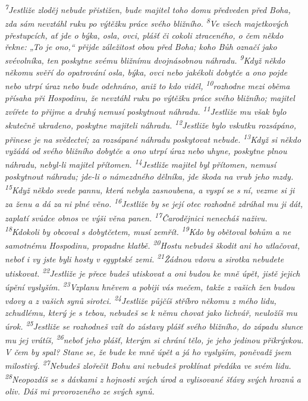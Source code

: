 \documentclass[11pt]{article}
\begin{document}
\textit{
\textsuperscript{7}Jestliže zloděj nebude přistižen, bude majitel toho domu předveden před Boha, zda sám nevztáhl ruku po výtěžku práce svého bližního.
\textsuperscript{8}Ve všech majetkových přestupcích, ať jde o býka, osla, ovci, plášť či cokoli ztraceného, o čem někdo řekne: „To je ono,“ přijde záležitost obou před Boha; koho Bůh označí jako svévolníka, ten poskytne svému bližnímu dvojnásobnou náhradu.
\textsuperscript{9}Když někdo někomu svěří do opatrování osla, býka, ovci nebo jakékoli dobytče a ono pojde nebo utrpí úraz nebo bude odehnáno, aniž to kdo viděl,
\textsuperscript{10}rozhodne mezi oběma přísaha při Hospodinu, že nevztáhl ruku po výtěžku práce svého bližního; majitel zvířete to přijme a druhý nemusí poskytnout náhradu.
\textsuperscript{11}Jestliže mu však bylo skutečně ukradeno, poskytne majiteli náhradu.
\textsuperscript{12}Jestliže bylo vskutku rozsápáno, přinese je na svědectví; za rozsápané náhradu poskytovat nebude.
\textsuperscript{13}Když si někdo vyžádá od svého bližního dobytče a ono utrpí úraz nebo uhyne, poskytne plnou náhradu, nebyl-li majitel přítomen.
\textsuperscript{14}Jestliže majitel byl přítomen, nemusí poskytnout náhradu; jde-li o námezdného dělníka, jde škoda na vrub jeho mzdy.
\textsuperscript{15}Když někdo svede pannu, která nebyla zasnoubena, a vyspí se s ní, vezme si ji za ženu a dá za ni plné věno.
\textsuperscript{16}Jestliže by se její otec rozhodně zdráhal mu ji dát, zaplatí svůdce obnos ve výši věna panen.
\textsuperscript{17}Čarodějnici nenecháš naživu.
\textsuperscript{18}Kdokoli by obcoval s dobytčetem, musí zemřít.
\textsuperscript{19}Kdo by obětoval bohům a ne samotnému Hospodinu, propadne klatbě.
\textsuperscript{20}Hostu nebudeš škodit ani ho utlačovat, neboť i vy jste byli hosty v egyptské zemi.
\textsuperscript{21}Žádnou vdovu a sirotka nebudete utiskovat.
\textsuperscript{22}Jestliže je přece budeš utiskovat a oni budou ke mně úpět, jistě jejich úpění vyslyším.
\textsuperscript{23}Vzplanu hněvem a pobiji vás mečem, takže z vašich žen budou vdovy a z vašich synů sirotci.
\textsuperscript{24}Jestliže půjčíš stříbro někomu z mého lidu, zchudlému, který je s tebou, nebudeš se k němu chovat jako lichvář, neuložíš mu úrok.
\textsuperscript{25}Jestliže se rozhodneš vzít do zástavy plášť svého bližního, do západu slunce mu jej vrátíš,
\textsuperscript{26}neboť jeho plášť, kterým si chrání tělo, je jeho jedinou přikrývkou. V čem by spal? Stane se, že bude ke mně úpět a já ho vyslyším, poněvadž jsem milostivý.
\textsuperscript{27}Nebudeš zlořečit Bohu ani nebudeš proklínat předáka ve svém lidu.
\textsuperscript{28}Neopozdíš se s dávkami z hojnosti svých úrod a vylisované šťávy svých hroznů a oliv. Dáš mi prvorozeného ze svých synů.
}
\end{document}
